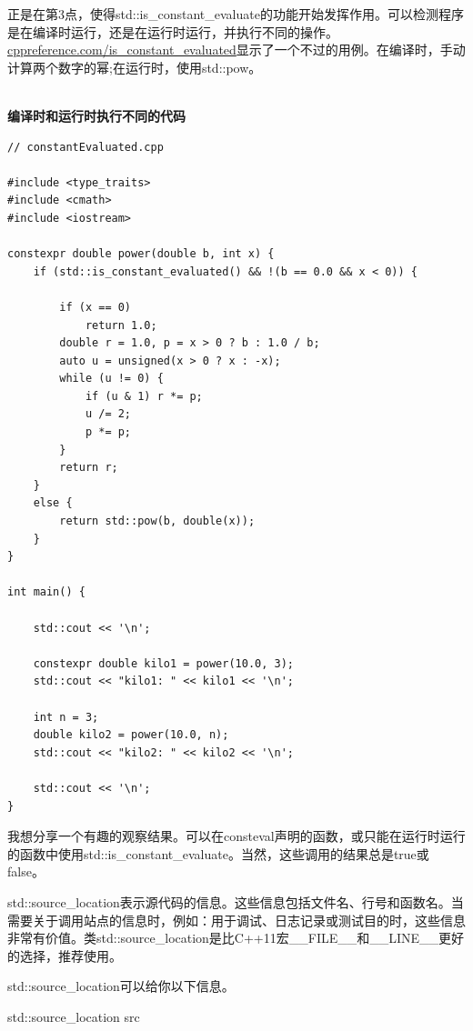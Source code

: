 正是在第3点，使得std::is\_constant\_evaluate的功能开始发挥作用。可以检测程序是在编译时运行，还是在运行时运行，并执行不同的操作。\href{https://en.cppreference.com/w/cpp/types/is_constant_evaluated}{cppreference.com/is\_constant\_evaluated}显示了一个不过的用例。在编译时，手动计算两个数字的幂;在运行时，使用std::pow。

\hspace*{\fill} \\ %
\noindent
\textbf{编译时和运行时执行不同的代码}
\begin{lstlisting}[style=styleCXX]
// constantEvaluated.cpp

#include <type_traits>
#include <cmath>
#include <iostream>

constexpr double power(double b, int x) {
	if (std::is_constant_evaluated() && !(b == 0.0 && x < 0)) {
		
		if (x == 0)
			return 1.0;
		double r = 1.0, p = x > 0 ? b : 1.0 / b;
		auto u = unsigned(x > 0 ? x : -x);
		while (u != 0) {
			if (u & 1) r *= p;
			u /= 2;
			p *= p;
		}
		return r;
	}
	else {
		return std::pow(b, double(x));
	}
}

int main() {
	
	std::cout << '\n';
	
	constexpr double kilo1 = power(10.0, 3);
	std::cout << "kilo1: " << kilo1 << '\n';
	
	int n = 3;
	double kilo2 = power(10.0, n);
	std::cout << "kilo2: " << kilo2 << '\n';
	
	std::cout << '\n';
}
\end{lstlisting}

我想分享一个有趣的观察结果。可以在consteval声明的函数，或只能在运行时运行的函数中使用std::is\_constant\_evaluate。当然，这些调用的结果总是true或false。


std::source\_location表示源代码的信息。这些信息包括文件名、行号和函数名。当需要关于调用站点的信息时，例如：用于调试、日志记录或测试目的时，这些信息非常有价值。类std::source\_location是比C++11宏\_\_FILE\_\_和\_\_LINE\_\_更好的选择，推荐使用。

std::source\_location可以给你以下信息。

\begin{center}
std::source\_location src
\end{center}

